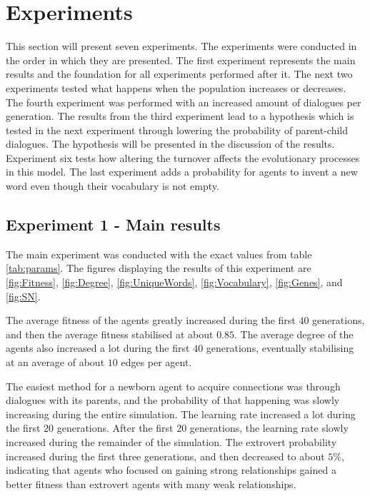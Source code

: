 \section{Experiments}
This section will present seven experiments. The experiments were conducted in the order in which they are presented. The first experiment represents the main results and the foundation for all experiments performed after it. The next two experiments tested what happens when the population increases or decreases. The fourth experiment was performed with an increased amount of dialogues per generation. The results from the third experiment lead to a hypothesis which is tested in the next experiment through lowering the probability of parent-child dialogues. The hypothesis will be presented in the discussion of the results. Experiment six tests how altering the turnover affects the evolutionary processes in this model. The last experiment adds a probability for agents to invent a new word even though their vocabulary is not empty.

\subsection{Experiment 1 - Main results}
The main experiment was conducted with the exact values from table \ref{tab:params}. The figures displaying the results of this experiment are \ref{fig:Fitness}, \ref{fig:Degree}, \ref{fig:UniqueWords}, \ref{fig:Vocabulary}, \ref{fig:Genes}, and \ref{fig:SN}. 

The average fitness of the agents greatly increased during the first $40$ generations, and then the average fitness stabilised at about $0.85$. The average degree of the agents also increased a lot during the first $40$ generations, eventually stabilising at an average of about $10$ edges per agent. 

The easiest method for a newborn agent to acquire connections was through dialogues with its parents, and the probability of that happening was slowly increasing during the entire simulation. The learning rate increased a lot during the first $20$ generations. After the first $20$ generations, the learning rate slowly increased during the remainder of the simulation. The extrovert probability increased during the first three generations, and then decreased to about $5\%$, indicating that agents who focused on gaining strong relationships gained a better fitness than extrovert agents with many weak relationships. 

